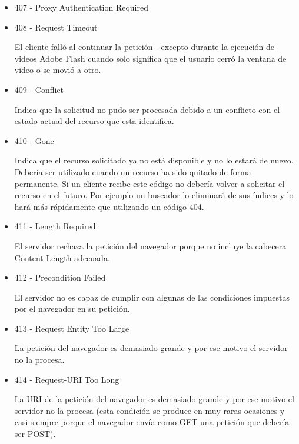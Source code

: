 \documentclass[a4paper,10pt]{article}
\begin{document}
\begin{enumerate}
\begin{enumerate}
\begin{itemize}
\begin{itemize}
                            \item 407 - Proxy Authentication Required

                            \item 408 - Request Timeout

                            El cliente falló al continuar la petición - excepto durante la ejecución de videos Adobe Flash cuando solo significa que el usuario cerró la ventana de video o se movió a otro.

                            \item 409 - Conflict

                            Indica que la solicitud no pudo ser procesada debido a un conflicto con el estado actual del recurso que esta identifica.

                            \item 410 - Gone

                            Indica que el recurso solicitado ya no está disponible y no lo estará de nuevo. Debería ser utilizado cuando un recurso ha sido quitado de forma permanente. Si un cliente recibe este código no debería volver a solicitar el recurso en el futuro. Por ejemplo un buscador lo eliminará de sus índices y lo hará más rápidamente que utilizando un código 404.

                            \item 411 - Length Required

                            El servidor rechaza la petición del navegador porque no incluye la cabecera Content-Length adecuada.

                            \item 412 - Precondition Failed

                            El servidor no es capaz de cumplir con algunas de las condiciones impuestas por el navegador en su petición.

                            \item 413 - Request Entity Too Large

                            La petición del navegador es demasiado grande y por ese motivo el servidor no la procesa.

                            \item 414 - Request-URI Too Long

                            La URI de la petición del navegador es demasiado grande y por ese motivo el servidor no la procesa (esta condición se produce en muy raras ocasiones y casi siempre porque el navegador envía como GET una petición que debería ser POST).


\end{itemize}
\end{itemize}
\end{enumerate}
\end{enumerate}
\end{document}
